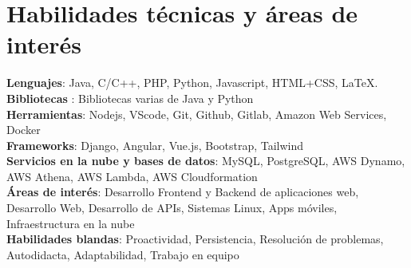 \documentclass[a4paper,11pt]{article}
\makeatletter
\newcommand{\resumePOR}[3]{
\vspace{0.5mm}\item
    \begin{tabular*}{0.97\textwidth}[t]{l@{\extracolsep{\fill}}r}
        \textbf{#1}\hspace{0.3mm}#2 & \textit{\small{#3}} 
    \end{tabular*}
    \vspace{-2mm}
}
\newcommand{\resumeSubHeadingListStart}{\begin{itemize}[leftmargin=*,labelsep=0mm]}
\newcommand{\resumeItemListStart}{\begin{justify}\begin{itemize}[leftmargin=3ex, rightmargin=2ex, noitemsep,labelsep=1.2mm,itemsep=0mm]\small}
\newcommand{\resumeSubHeadingListEnd}{\end{itemize}\vspace{2mm}}
\newcommand{\resumeItemListEnd}{\end{itemize}\end{justify}\vspace{-2mm}}
\makeatother
\begin{document}
\section{\textbf{Habilidades técnicas y áreas de interés}}
 \begin{itemize}[leftmargin=0.05in, label={}]
    \small{\item{
     \textbf{Lenguajes}{: Java, C/C++, PHP, Python, Javascript, HTML+CSS, LaTeX. } \\
     \textbf{Bibliotecas }{: Bibliotecas varias de Java y Python }\\ 
     \textbf{Herramientas}{: Nodejs, VScode, Git, Github, Gitlab, Amazon Web Services, Docker } \\ 
     \textbf{Frameworks}{: Django, Angular, Vue.js, Bootstrap, Tailwind } \\
     \textbf{Servicios en la nube y bases de datos}{: MySQL, PostgreSQL, AWS Dynamo, AWS Athena, AWS Lambda, AWS Cloudformation } \\   
     \textbf{Áreas de interés}{: Desarrollo Frontend y Backend de aplicaciones web, Desarrollo Web, Desarrollo de APIs, Sistemas Linux, Apps móviles, Infraestructura en la nube } \\
     \textbf{Habilidades blandas}{: Proactividad, Persistencia, Resolución de problemas, Autodidacta, Adaptabilidad, Trabajo en equipo} \\
    }}
 \end{itemize}
 \vspace{-16pt}



\begin{comment}
\section{\textbf{Positions of Responsibility}}
\vspace{-0.4mm}
\resumeSubHeadingListStart
\resumePOR{On Desk Registrations Volunteer } %
    {Aarhant Cyber Week Event - RCOEM, Nagpur} %
    {Oct - Dec 2022} %
    \resumeItemListStart
    \item {Helped to attract close to 300 attendees to the event.}
    \item {Collected over Rs. 20,000 in entry fees for different activities.}
    \resumeItemListEnd

\resumeSubHeadingListEnd
\vspace{-5mm}
\end{comment}
\end{document}
